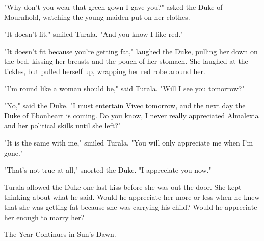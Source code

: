 "Why don't you wear that green gown I gave you?" asked the Duke of Mournhold, watching the young maiden put on her clothes.

"It doesn't fit," smiled Turala. "And you know I like red."

"It doesn't fit because you're getting fat," laughed the Duke, pulling her down on the bed, kissing her breasts and the pouch of her stomach. She laughed at the tickles, but pulled herself up, wrapping her red robe around her.

"I'm round like a woman should be," said Turala. "Will I see you tomorrow?"

"No," said the Duke. "I must entertain Vivec tomorrow, and the next day the Duke of Ebonheart is coming. Do you know, I never really appreciated Almalexia and her political skills until she left?"

"It is the same with me," smiled Turala. "You will only appreciate me when I'm gone."

"That's not true at all," snorted the Duke. "I appreciate you now."

Turala allowed the Duke one last kiss before she was out the door. She kept thinking about what he said. Would he appreciate her more or less when he knew that she was getting fat because she was carrying his child? Would he appreciate her enough to marry her?

The Year Continues in Sun's Dawn.